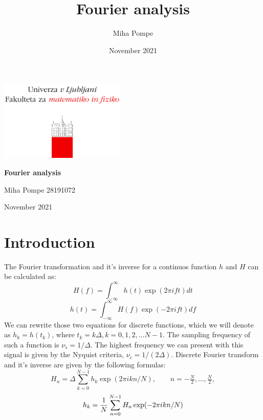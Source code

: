 \documentclass[12pt, a4paper]{article}
\title{Fourier analysis}
\author{Miha Pompe}
\date{November 2021}
\begin{document}
\begin{titlepage}
	\centering
 	\includegraphics[width=0.45\textwidth]{logo_fmf_uni-lj_sl_veliki.png}\par\vspace{1cm}

	\vspace{1cm}

	\vspace{1.5cm}
	{\huge\bfseries Fourier analysis\par}
	\vspace{2cm}
	{\Large Miha Pompe 28191072\par}
	\vfill

	\vfill

	{\large November 2021\par}
\end{titlepage}
\thispagestyle{empty}
\clearpage
{}
\newpage


\section{Introduction}
The Fourier transformation and it's inverse for a continuos function $h$ and $H$ can be calculated as:
\begin{equation}
  H(f) = \int_{-\infty}^\infty h(t)\exp(2 \pi i f t) dt
  \label{eq:ft}
\end{equation}
\begin{equation}
  h(t) = \int_{-\infty}^\infty H(f)\exp(-2 \pi i f t)df
\end{equation}
We can rewrite those two equations for discrete functions, which we will denote as $h_k = h(t_k)$, where $t_k = k\Delta, k = 0,1,2,\dots N-1$. The sampling frequency of such a function is $\nu_s = 1/\Delta$. The highest frequency we can present with this signal is given by the Nyquist criteria, $\nu_c = 1/(2\Delta)$. Discrete Fourier transform and it's inverse are given by the following formulas:
\begin{equation}
  H_n = \Delta \sum_{k=0}^{N-1} h_k \exp(2 \pi i k n / N),  \qquad n=-\tfrac{N}{2},\dots ,\tfrac{N}{2},
  \label{eq:dft}
\end{equation}
\begin{equation}
  h_k = {1\over N} \sum_{n=0}^{N-1} H_n \exp(-2 \pi i k n / N)
  \label{eq:inverz}
\end{equation}
\end{document}
